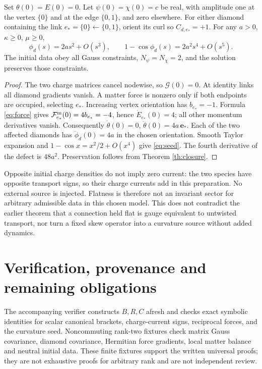 \documentclass[11pt,a4paper]{article}
\begin{document}
\begin{corollary}
Set $\theta(0)=E(0)=0$. Let $\psi(0)=\chi(0)=c$ be real, with amplitude one at the vertex $\{0\}$ and at the edge $\{0,1\}$, and zero elsewhere. For either diamond containing the link $e_*=\{0\}\leftarrow\{0,1\}$, orient its curl so $C_{d,e_*}=+1$. For any $a>0$, $\kappa\geq0$, $\mu\geq0$,
\begin{equation}
\phi_d(s)=2as^2+O(s^3),\qquad
1-\cos\phi_d(s)=2a^2s^4+O(s^5).\label{eq:seed}
\end{equation}
The initial data obey all Gauss constraints, $N_\psi=N_\chi=2$, and the solution preserves those constraints.
\end{corollary}
\begin{proof}
The two charge matrices cancel nodewise, so $\mathcal G(0)=0$. At identity links all diamond gradients vanish. A matter force is nonzero only if both endpoints are occupied, selecting $e_*$. Increasing vertex orientation has $b_{e_*}=-1$. Formula \eqref{eq:force} gives $\mathcal F^{\rm m}_{e_*}(0)=4b_{e_*}=-4$, hence $\dot E_{e_*}(0)=4$; all other momentum derivatives vanish. Consequently $\dot\theta(0)=0$, $\ddot\theta(0)=4a\,\mathbf e_*$. Each of the two affected diamonds has $\ddot\phi_d(0)=4a$ in the chosen orientation. Smooth Taylor expansion and $1-\cos x=x^2/2+O(x^4)$ give \eqref{eq:seed}. The fourth derivative of the defect is $48a^2$. Preservation follows from Theorem \ref{th:closure}.
\end{proof}
Opposite initial charge densities do not imply zero current: the two species have opposite transport signs, so their charge currents add in this preparation. No external source is injected. Flatness is therefore not an invariant sector for arbitrary admissible data in this chosen model. This does not contradict the earlier theorem that a connection held flat is gauge equivalent to untwisted transport, nor turn a fixed skew operator into a curvature source without added dynamics.

\newpage
\section{Verification, provenance and remaining obligations}
The accompanying verifier constructs $B,R,C$ afresh and checks exact symbolic identities for scalar canonical brackets, charge-current signs, reciprocal forces, and the curvature seed. Noncommuting rank-two fixtures check matrix Gauss covariance, diamond covariance, Hermitian force gradients, local matter balance and neutral initial data. These finite fixtures support the written universal proofs; they are not exhaustive proofs for arbitrary rank and are not independent review.
\end{document}
